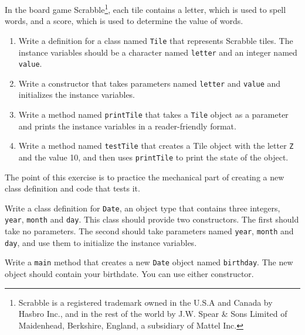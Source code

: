 \begin{exercise}
In the board game Scrabble\footnote{Scrabble is a registered trademark
owned in the U.S.A and Canada by Hasbro Inc., and in the rest of the world
by J.W. Spear \& Sons Limited of Maidenhead, Berkshire, England, a subsidiary
of Mattel Inc.}, each tile contains a letter, which is used to spell
words, and a score, which is used to determine the value of words.

\begin{enumerate}

\item Write a definition for a class named {\tt Tile}
that represents Scrabble tiles.  The instance variables should
be a character named {\tt letter} and an integer named {\tt value}.

\item Write a constructor that takes parameters named {\tt letter}
and {\tt value} and initializes the instance variables.

\item Write a method named {\tt printTile} that takes a {\tt Tile}
object as a parameter and prints the instance variables in
a reader-friendly format.

\item Write a method named {\tt testTile} that creates a
Tile object with the letter {\tt Z} and the value 10, and
then uses {\tt printTile} to print the state of the object.

\end{enumerate}

The point of this exercise is to practice the mechanical part
of creating a new class definition and code that tests it.
\end{exercise}


\begin{exercise}
Write a class definition for {\tt Date}, an object type that
contains three integers, {\tt year}, {\tt month} and {\tt day}.
This class should provide two constructors.  The first should
take no parameters.  The second should take parameters named
{\tt year}, {\tt month} and {\tt day}, and use them to initialize
the instance variables.

Write a {\tt main} method that creates a new {\tt Date} object
named {\tt birthday}.  The new object should contain your birthdate.
You can use either constructor.
\end{exercise}


